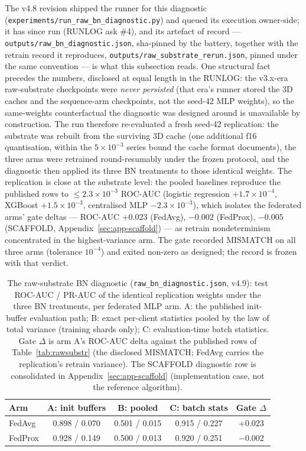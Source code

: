 The v4.8 revision shipped the runner for this diagnostic
(\texttt{experiments/run\_raw\_bn\_diagnostic.py}) and queued its
execution owner-side; it has since run (RUNLOG ask \#4), and its
artefact of record --- \texttt{outputs/raw\_bn\_diagnostic.json},
sha-pinned by the battery, together with the retrain record it
reproduces, \texttt{outputs/raw\_substrate\_rerun.json}, pinned under
the same convention --- is what this subsection reads. One
structural fact precedes the numbers, disclosed at equal length in the
RUNLOG: the v3.x-era raw-substrate checkpoints were \emph{never
persisted} (that era's runner stored the 3D caches and the
sequence-arm checkpoints, not the seed-42 MLP weights), so the
same-weights counterfactual the diagnostic was designed around is
unavailable by construction. The run therefore re-evaluated a fresh
seed-42 replication: the substrate was rebuilt from the surviving 3D
cache (one additional f16 quantisation, within the $5\times10^{-3}$
series bound the cache format documents), the three arms were
retrained round-resumably under the frozen protocol, and the
diagnostic then applied its three BN treatments to those identical
weights. The replication is close at the substrate level: the pooled
baselines reproduce the published rows to $\le 2.3\times10^{-3}$
ROC-AUC (logistic regression $+1.7\times10^{-4}$, XGBoost
$+1.5\times10^{-3}$, centralised MLP $-2.3\times10^{-3}$), which
isolates the federated arms' gate deltas --- ROC-AUC $+0.023$
(FedAvg), $-0.002$ (FedProx), $-0.005$ (SCAFFOLD,
Appendix~\ref{sec:app-scaffold}) --- as retrain
nondeterminism concentrated in the highest-variance arm. The gate
recorded MISMATCH on all three arms (tolerance $10^{-4}$) and exited
non-zero as designed; the record is frozen with that verdict.

\begin{table}[t]
\centering
\caption{The raw-substrate BN diagnostic
(\texttt{raw\_bn\_diagnostic.json}, v4.9): test ROC-AUC / PR-AUC of
the identical replication weights under the three BN treatments, per
federated MLP arm. A: the published init-buffer evaluation path; B:
exact per-client statistics pooled by the law of total variance
(training shards only); C: evaluation-time batch statistics. Gate
$\Delta$ is arm A's ROC-AUC delta against the published rows of
Table~\ref{tab:rawsubstr} (the disclosed MISMATCH; FedAvg carries
the replication's retrain variance). The SCAFFOLD diagnostic row is
consolidated in Appendix~\ref{sec:app-scaffold} (implementation
case, not the reference algorithm).}
\label{tab:rawbndiag}
\small
\begin{tabular}{@{}l c c c c@{}}
\toprule
\textbf{Arm} & \textbf{A: init buffers} & \textbf{B: pooled} &
\textbf{C: batch stats} & \textbf{Gate $\Delta$} \\
\midrule
FedAvg   & 0.898 / 0.070 & 0.501 / 0.015 & 0.915 / 0.227 & $+0.023$ \\
FedProx  & 0.928 / 0.149 & 0.500 / 0.013 & 0.920 / 0.251 & $-0.002$ \\
\bottomrule
\end{tabular}
\end{table}

